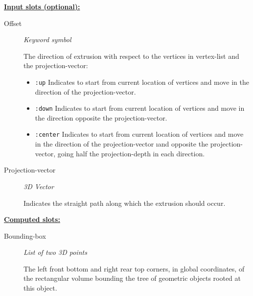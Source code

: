 \documentclass [11pt]{book}
\begin{document}
\begin{itemize}
\textbf{
\underline{Input slots (optional):}}

\begin{description}

\item [Offset]
\emph{Keyword symbol}

 The direction of extrusion with respect to the vertices in vertex-list and the projection-vector:


\begin{itemize}

\item \texttt{:up} Indicates to start from current location of vertices and move in the direction of
the projection-vector.


\item \texttt{:down} Indicates to start from current location of vertices and move in the direction opposite
the projection-vector.


\item \texttt{:center} Indicates to start from current location of vertices and move in the direction of
the projection-vector 
\i{and} opposite the projection-vector, going half the projection-depth in
each direction.


\end{itemize}






\item [Projection-vector]
\emph{3D Vector}

 Indicates the straight path along which the extrusion should occur.




\end{description}






\textbf{
\underline{Computed slots:}}

\begin{description}

\item [Bounding-box]
\emph{List of two 3D points}

 The left front bottom and right rear top corners, in global coordinates,
of the rectangular volume bounding the tree of geometric objects rooted at this object.





\end{description}
\end{itemize}
\end{document}

